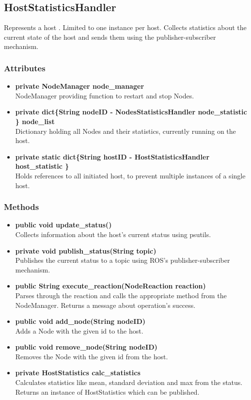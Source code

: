 \subsection{HostStatisticsHandler}
Represents a host . Limited to one instance per host. Collects statistics about the current state of the host and sends them using the publisher-subscriber mechanism.

\subsubsection{Attributes}
\begin{itemize}
	\item \textbf{private NodeManager node\_manager}\\
			NodeManager providing function to restart and stop Nodes.
	\item \textbf{private  dict\{String nodeID  - NodesStatisticsHandler node\_statistic  \} node\_list}\\
			Dictionary holding all Nodes and their statistics, currently running on the host.
	\item \textbf{private static dict\{String hostID   - HostStatisticsHandler host\_statistic \}}\\
			Holds references to all initiated host, to prevent multiple instances of a single host.
\end{itemize}

\subsubsection{Methods}
\begin{itemize}
	\item \textbf{public void update\_status()}\\
			Collects information about the host's current status using psutils.
	\item \textbf{private void publish\_status(String topic)}\\
			Publishes the current status to a topic using ROS's publisher-subscriber mechanism.
	\item \textbf{public String execute\_reaction(NodeReaction reaction)}\\
			Parses through the reaction and calls the appropriate method from the NodeManager.
			Returns a message about operation's success.
	\item \textbf{public void add\_node(String nodeID)}\\
			Adds a Node with the given id to the host.
	\item \textbf{public void remove\_node(String nodeID)}\\
			Removes the Node with the given id from the host.
	\item \textbf{private HostStatistics calc\_statistics}\\
			Calculates statistics like mean, standard deviation and max from the status.
			Returns an instance of HostStatistics which can be published.
\end{itemize}


